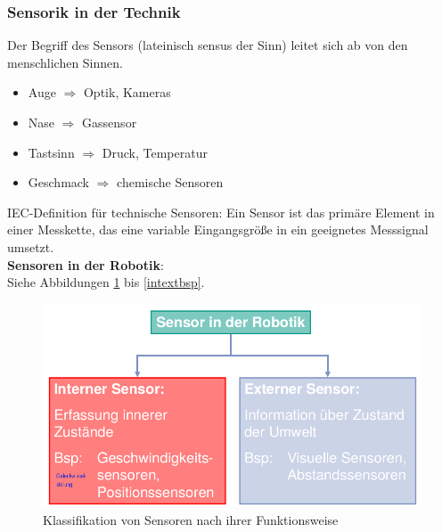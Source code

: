 \subsubsection{Sensorik in der Technik}
Der Begriff des Sensors (lateinisch \glqq sensus\grqq{} der Sinn) leitet sich ab von den menschlichen Sinnen.
\begin{itemize}
\setlength\itemsep{0em}
\item Auge $\Rightarrow$ Optik, Kameras
\item Nase $\Rightarrow$ Gassensor
\item Tastsinn $\Rightarrow$ Druck, Temperatur
\item Geschmack $\Rightarrow$ chemische Sensoren
\end{itemize}
IEC-Definition für technische Sensoren:
\glqq Ein Sensor ist das primäre Element in einer Messkette, das eine variable Eingangsgröße in ein geeignetes Messsignal umsetzt.\grqq \\
\textbf{Sensoren in der Robotik}:\\
Siehe Abbildungen \ref{klassfkt} bis \ref{intextbsp}.
\begin{figure}[h!]
	\centering
	\includegraphics[width=0.5\linewidth]{figures/ch04_sensrob.png}
	\caption{Klassifikation von Sensoren nach ihrer Funktionsweise}
	\label{klassfkt}
\end{figure}
